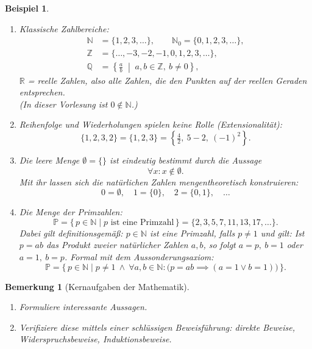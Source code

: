 \documentclass[a4paper]{article}
\theoremstyle{kurzskript}
\newtheorem{bemerkung}[satz]{Bemerkung}
\newtheorem{beispiel}[satz]{Beispiel}
\newcommand{\N}{\mathbb{N}}
\newcommand{\Z}{\mathbb{Z}}
\newcommand{\Q}{\mathbb{Q}}
\newcommand{\R}{\mathbb{R}}
\newcommand{\Pm}{\mathbb{P}}
\begin{document}
\begin{beispiel}
\leavevmode
\begin{enumerate}[label=(\alph*)]
  \item \emph{Klassische Zahlbereiche:}
  \begin{align*}
    \N   &= \{1, 2, 3, \dots\}, \qquad \N_0 = \{0, 1, 2, 3, \dots\},\\
    \Z   &= \{\dots, -3, -2, -1, 0, 1, 2, 3, \dots\},\\
    \Q   &= \left\{ \tfrac{a}{b} \;\middle|\; a, b \in \Z,\ b \neq 0 \right\},
  \end{align*}
  $\R$ = reelle Zahlen, also alle Zahlen, die den Punkten auf der reellen Geraden entsprechen. \\
  (In dieser Vorlesung ist $0 \notin \N$.)

  \item Reihenfolge und Wiederholungen spielen keine Rolle (Extensionalität):
  \[
    \{1, 2, 3, 2\} = \{1, 2, 3\} = \left\{ \tfrac{4}{2},\ 5-2,\ (-1)^2 \right\}.
  \]

  \item Die \emph{leere Menge} $\emptyset = \{\}$ ist eindeutig bestimmt durch die Aussage
  \[
    \forall x: x \notin \emptyset.
  \]
  Mit ihr lassen sich die natürlichen Zahlen mengentheoretisch konstruieren:
  \[
    0 = \emptyset,\quad 1 = \{0\},\quad 2 = \{0, 1\},\quad \dots
  \]

  \item Die Menge der \emph{Primzahlen}:
  \[
    \Pm = \{\, p \in \N \mid p \text{ ist eine Primzahl} \,\} = \{2, 3, 5, 7, 11, 13, 17, \dots\}.
  \]
  Dabei gilt definitionsgemäß: $p \in \N$ ist eine Primzahl, falls $p \neq 1$ und gilt: Ist $p = ab$ das Produkt zweier natürlicher Zahlen $a, b$, so folgt $a = p,\ b = 1$ oder $a = 1,\ b = p$. Formal mit dem Aussonderungsaxiom:
  \[
    \Pm = \{\, p \in \N \mid p \neq 1 \ \land\ \forall a, b \in \N: \bigl(p = ab \implies (a = 1 \lor b = 1)\bigr) \,\}.
  \]
\end{enumerate}
\end{beispiel}

\begin{bemerkung}[Kernaufgaben der Mathematik]
\leavevmode
\begin{enumerate}
  \item Formuliere interessante Aussagen.
  \item Verifiziere diese mittels einer schlüssigen Beweisführung: \emph{direkte Beweise}, \emph{Widerspruchsbeweise}, \emph{Induktionsbeweise}.
\end{enumerate}
\end{bemerkung}
\end{document}
